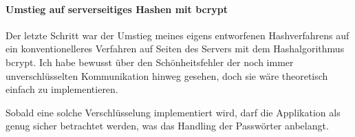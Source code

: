 \documentclass[../main.tex]{subfiles}
\begin{document}
	\paragraph{Umstieg auf serverseitiges Hashen mit bcrypt}
	Der letzte Schritt war der Umstieg meines eigens entworfenen Hashverfahrens auf ein konventionelleres Verfahren auf Seiten des Servers mit dem Hashalgorithmus bcrypt. Ich habe bewusst über den Schönheitsfehler der noch immer unverschlüsselten Kommunikation hinweg gesehen, doch sie wäre theoretisch einfach zu implementieren. 
	
	Sobald eine solche Verschlüsselung implementiert wird, darf die Applikation als genug sicher betrachtet werden, was das Handling der Passwörter anbelangt.
	
\end{document}
